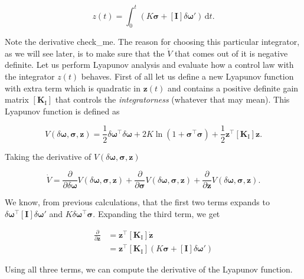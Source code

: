 \documentclass{article}
\begin{document}
$$
z(t) = \int_{0}^{t}(K\bm{\sigma} + [\bm{I}]\delta\bm{\omega}')\,\text{d}t.
$$

Note the derivative check\_me. The reason for choosing this particular integrator, as we will see later, is to make sure that the $\dot{V}$ that comes out of it is negative definite. Let us perform Lyapunov analysis and evaluate how a control law with the integrator $z(t)$ behaves. First of all let us define a new Lyapunov function with extra term which is quadratic in $\bm{z}(t)$ and contains a positive definite gain matrix $[\bm{K}_{\text{I}}]$ that controls the \textit{integratorness} (whatever that may mean). This Lyapunov function is defined as

$$
V(\delta\bm{\omega},\bm{\sigma},\bm{z}) = \frac{1}{2}\delta\bm{\omega}^{\intercal}\delta\bm{\omega} + 2K\ln(1+\bm{\sigma}^{\intercal}\bm{\sigma}) + \frac{1}{2}\bm{z}^{\intercal}[\bm{K}_{\text{I}}]\bm{z}.
$$

Taking the derivative of $V(\delta\bm{\omega},\bm{\sigma},\bm{z})$

$$
\dot{V} = \frac{\partial}{\partial\delta\bm{\omega}}V(\delta\bm{\omega},\bm{\sigma},\bm{z}) + \frac{\partial}{\partial\bm{\sigma}}V(\delta\bm{\omega},\bm{\sigma},\bm{z}) + \frac{\partial}{\partial\bm{z}}V(\delta\bm{\omega},\bm{\sigma},\bm{z}).
$$

We know, from previous calculations, that the first two terms expands to $\delta\bm{\omega}^{\intercal}[\bm{I}]\delta\bm{\omega}'$ and $K\delta\bm{\omega}^{\intercal}\bm{\sigma}$. Expanding the third term, we get

\begin{equation}
  \begin{split}
    \frac{\partial}{\partial\bm{z}}
    &=\bm{z}^{\intercal}[\bm{K}_{\text{I}}]\dot{\bm{z}}\\
    &=\bm{z}^{\intercal}[\bm{K}_{\text{I}}]\left(K\bm{\sigma}+[\bm{I}]\delta\bm{\omega}'\right)
  \end{split}
\end{equation}

Using all three terms, we can compute the derivative of the Lyapunov function.
\end{document}
